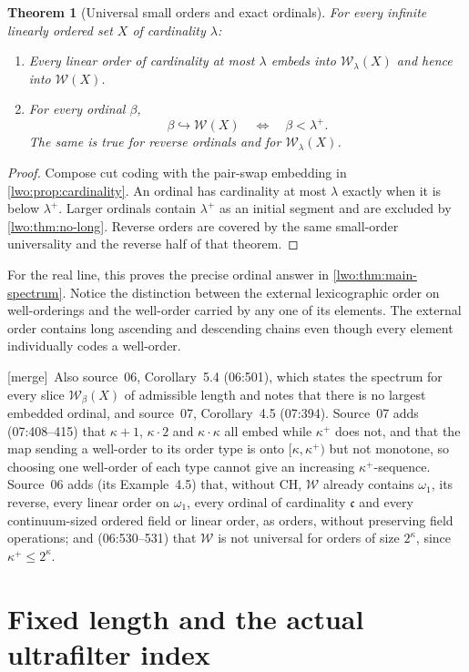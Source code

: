 \documentclass[11pt,a4paper]{article}
\newtheorem{theorem}{Theorem}[section]
\theoremstyle{definition}
\theoremstyle{remark}
\newcommand{\W}{\mathcal W}
\newcommand{\emb}{\hookrightarrow}
\newcommand{\con}{\mathfrak c}
\newcommand{\merge}{\textsf{[merge]}}
\begin{document}
\begin{theorem}[Universal small orders and exact ordinals]\label{lwo:thm:ordinal-spectrum}
For every infinite linearly ordered set $X$ of cardinality $\lambda$:
\begin{enumerate}[label=(\alph*)]
\item Every linear order of cardinality at most $\lambda$ embeds into
$\W_\lambda(X)$ and hence into $\W(X)$.
\item For every ordinal $\beta$,
\[
       \beta\emb\W(X)\quad\Longleftrightarrow\quad\beta<\lambda^+.
\]
The same is true for reverse ordinals and for $\W_\lambda(X)$.
\end{enumerate}
\end{theorem}
\begin{proof}
Compose cut coding with the pair-swap embedding in
\cref{lwo:prop:cardinality}. An ordinal has cardinality at most $\lambda$
exactly when it is below $\lambda^+$. Larger ordinals contain
$\lambda^+$ as an initial segment and are excluded by \cref{lwo:thm:no-long}.
Reverse orders are covered by the same small-order universality and the
reverse half of that theorem.
\end{proof}

For the real line, this proves the precise ordinal answer in
\cref{lwo:thm:main-spectrum}. Notice the distinction between the external
lexicographic order on well-orderings and the well-order carried by any one
of its elements. The external order contains long ascending and descending
chains even though every element individually codes a well-order.

\merge\ Also source~06, Corollary~5.4 (06:501), which states the spectrum for
every slice $\W_\beta(X)$ of admissible length and notes that there is no
largest embedded ordinal, and source~07, Corollary~4.5 (07:394). Source~07
adds (07:408--415) that $\kappa+1$, $\kappa\cdot2$ and $\kappa\cdot\kappa$
all embed while $\kappa^+$ does not, and that the map sending a well-order to
its order type is onto $[\kappa,\kappa^+)$ but not monotone, so choosing one
well-order of each type cannot give an increasing $\kappa^+$-sequence.
Source~06 adds (its Example~4.5) that, without CH, $\W$ already contains
$\omega_1$, its reverse, every linear order on $\omega_1$, every ordinal of
cardinality $\con$ and every continuum-sized ordered field or linear order,
as orders, without preserving field operations; and (06:530--531) that $\W$ is
not universal for orders of size $2^\kappa$, since $\kappa^+\le2^\kappa$.

\section{Fixed length and the actual ultrafilter index}\label{lwo:sec:fixed}
\end{document}
